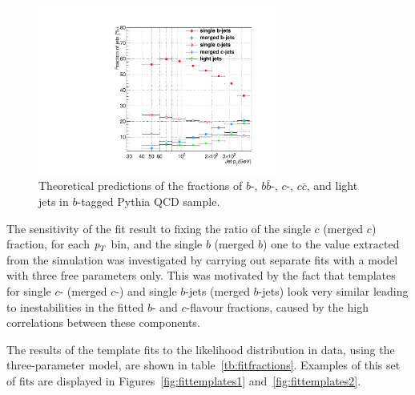 \begin{figure}[tp]
\centering
\includegraphics[width=0.70\textwidth]{TrueFractions_NominalPythia.pdf}
\caption{Theoretical predictions of the fractions of $b$-, $b\bar{b}$-, $c$-, $c\bar{c}$, and light jets in $b$-tagged {\sc Pythia} QCD sample.}
\label{fig:truefractions}
\end{figure}


The sensitivity of the fit result to fixing the ratio of the single $c$ (merged $c$) fraction, for each ${\emph{p}_{T}}$ bin, and the single $b$ (merged $b$)  one to the value extracted from the simulation was investigated by carrying out separate fits with a model with three free parameters only. This was motivated by the fact that templates for single $c$- (merged $c$-)  and single $b$-jets (merged $b$-jets) look very similar leading to inestabilities in the fitted $b$- and $c$-flavour fractions, caused by the high correlations between these components. 


The results of the template fits to the likelihood distribution in data, using the three-parameter model, are shown in table~\ref{tb:fitfractions}. Examples of this set of fits are displayed in Figures~\ref{fig:fittemplates1} and~\ref{fig:fittemplates2}.


